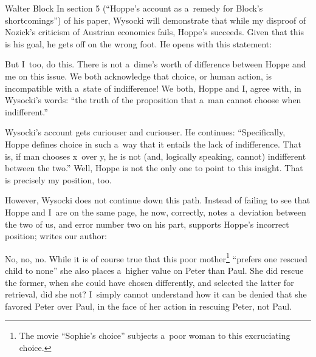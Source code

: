 \begin{artengenv}{Walter Block}
In section 5 (``Hoppe's account as a~remedy for Block's shortcomings'') of his paper, Wysocki will demonstrate that while my disproof of Nozick's criticism of Austrian economics fails, Hoppe's succeeds. Given that this is his goal, he gets off on the wrong foot. He opens with this statement:

But I~too, do this. There is not a~dime's worth of difference between Hoppe and me on this issue. We both acknowledge that choice, or human action, is incompatible with a~state of indifference! We both, Hoppe and I, agree with, in Wysocki's words: ``the truth of the proposition that a~man cannot choose when indifferent.''

Wysocki's account gets curiouser and curiouser. He continues: ``Specifically, Hoppe defines choice in such a~way that it entails the lack of indifference. That is, if man chooses x~over y, he is not (and, logically speaking, cannot) indifferent between the two.'' Well, Hoppe is not the only one to point to this insight. That is precisely my position, too.

However, Wysocki does not continue down this path. Instead of failing to see that Hoppe and I~are on the same page, he now, correctly, notes a~deviation between the two of us, and error number two on his part, supports Hoppe's incorrect position; writes our author:

No, no, no. While it is of course true that this poor mother\footnote{The movie ``Sophie's choice'' subjects a~poor woman to this excruciating choice.} ``prefers one rescued child to none'' she also places a~higher value on Peter than Paul. She did rescue the former, when she could have chosen differently, and selected the latter for retrieval, did she not? I~simply cannot understand how it can be denied that she favored Peter over Paul, in the face of her action in rescuing Peter, not Paul.


\end{artengenv}
